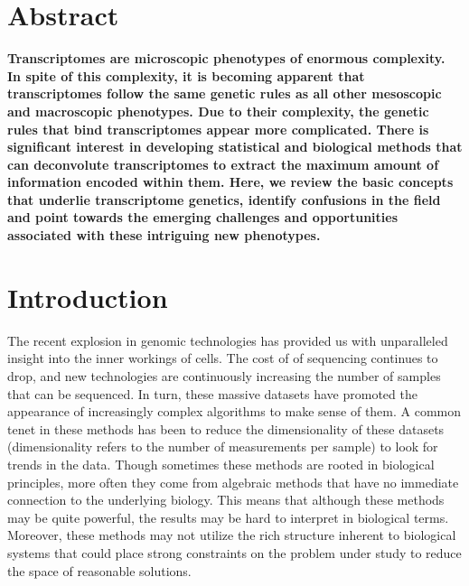 \newcommand{\allele}[1]{\mbox{\emph{#1}}}

\section*{Abstract}
  \textbf{Transcriptomes are microscopic phenotypes of enormous complexity. In
  spite of this complexity, it is becoming apparent that transcriptomes follow
  the same genetic rules as all other mesoscopic and macroscopic phenotypes. Due
  to their complexity, the genetic rules that bind transcriptomes appear more
  complicated. There is significant interest in developing statistical and
  biological methods that can deconvolute transcriptomes to extract the maximum
  amount of information encoded within them. Here, we review the basic concepts
  that underlie transcriptome genetics, identify confusions in the field and
  point towards the emerging challenges and opportunities associated with these
  intriguing new phenotypes.}

\section*{Introduction}
The recent explosion in genomic technologies has provided us with unparalleled
insight into the inner workings of cells. The cost of of sequencing continues to
drop, and new technologies are continuously increasing the number of samples
that can be sequenced. In turn, these massive datasets have promoted the
appearance of increasingly complex algorithms to make sense of them. A common
tenet in these methods has been to reduce the dimensionality of these datasets
(dimensionality refers to the number of measurements per sample) to look for
trends in the data. Though sometimes these methods are rooted in biological
principles, more often they come from algebraic methods that have no immediate
connection to the underlying biology. This means that although these methods may
be quite powerful, the results may be hard to interpret in biological terms.
Moreover, these methods may not utilize the rich structure inherent to
biological systems that could place strong constraints on the problem under
study to reduce the space of reasonable solutions.


